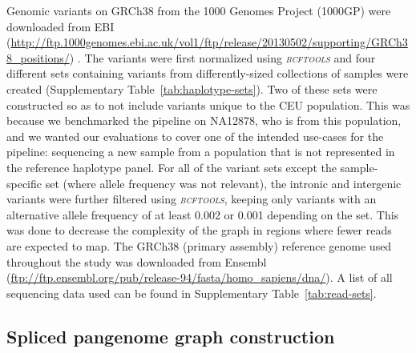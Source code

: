 \documentclass[11pt]{ucthesis}
\newcommand{\tool}[1]{\emph{\textsc{#1}}}
\begin{document}
Genomic variants on GRCh38 from the 1000 Genomes Project (1000GP) were downloaded from EBI (\url{http://ftp.1000genomes.ebi.ac.uk/vol1/ftp/release/20130502/supporting/GRCh38_positions/}) \cite{10002015global}. The variants were first normalized using \tool{bcftools} \cite{Li2011-xc} and four different sets containing variants from differently-sized collections  of samples were created (Supplementary Table~\ref{tab:haplotype-sets}). Two of these sets were constructed so as to not include variants unique to the CEU population. This was because we benchmarked the pipeline on NA12878, who is from this population, and we wanted our evaluations to cover one of the intended use-cases for the pipeline: sequencing a new sample from a population that is not represented in the reference haplotype panel. For all of the variant sets except the sample-specific set (where allele frequency was not relevant), the intronic and intergenic variants were further filtered using \tool{bcftools}, keeping only variants with an alternative allele frequency of at least 0.002 or 0.001 depending on the set. This was done to decrease the complexity of the graph in regions where fewer reads are expected to map. The GRCh38 (primary assembly) reference genome used throughout the study was downloaded from Ensembl (\url{ftp://ftp.ensembl.org/pub/release-94/fasta/homo_sapiens/dna/}).  
\newline 
\newline
A list of all sequencing data used can be found in Supplementary Table~\ref{tab:read-sets}. 

\subsection{Spliced pangenome graph construction}
\end{document}
